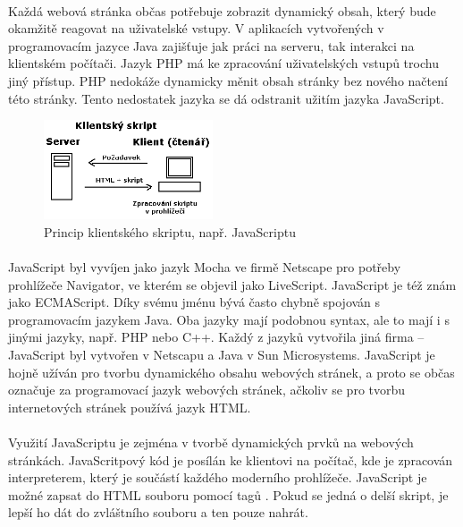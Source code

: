 \documentclass[11pt,a4paper,titlepage,oneside]{book}
\begin{document}
		\paragraph{} Každá webová stránka občas potřebuje zobrazit dynamický obsah, který bude okamžitě reagovat na uživatelské vstupy. V aplikacích vytvořených v programovacím jazyce Java zajišťuje jak práci na serveru, tak interakci na klientském počítači. Jazyk PHP má ke zpracování uživatelských vstupů trochu jiný přístup. PHP nedokáže dynamicky měnit obsah stránky bez nového načtení této stránky. Tento nedostatek jazyka se dá odstranit užitím jazyka JavaScript.


		\begin{figure}[!h]
			\begin{center}
				\includegraphics[width=5cm]{obrazky/klient_skript.png}
				\caption{Princip klientského skriptu, např. JavaScriptu}
				\label{fig:client}
			\end{center}
		\end{figure}	
		\paragraph{} JavaScript byl vyvíjen jako jazyk Mocha ve firmě Netscape pro potřeby prohlížeče Navigator, ve kterém se objevil jako LiveScript. JavaScript je též znám jako ECMAScript. Díky svému jménu bývá často chybně spojován s programovacím jazykem Java. Oba jazyky mají podobnou syntax, ale to mají i s jinými jazyky, např. PHP nebo C++. Každý z jazyků vytvořila jiná firma -- JavaScript byl vytvořen v Netscapu a Java v Sun Microsystems. JavaScript je hojně užíván pro tvorbu dynamického obsahu webových stránek, a proto se občas označuje za programovací jazyk webových stránek, ačkoliv se pro tvorbu internetových stránek používá jazyk HTML.


		\paragraph{} Využití JavaScriptu je zejména v tvorbě dynamických prvků na webových stránkách. JavaScritpový kód je posílán ke klientovi na počítač, kde je zpracován\label{fig:client} interpreterem, který je součástí každého moderního prohlížeče. JavaScript je možné zapsat do HTML souboru pomocí tagů . Pokud se jedná o delší skript, je lepší ho dát do zvláštního souboru a ten pouze nahrát.
\end{document}
